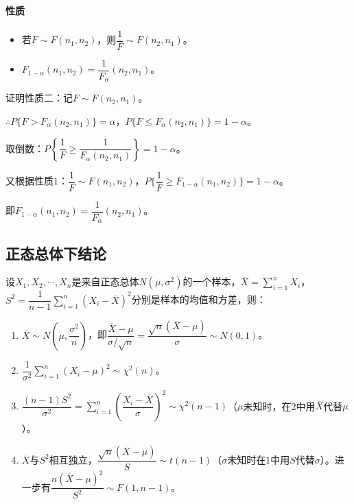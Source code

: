 \documentclass[UTF8, 12pt]{ctexart}
\begin{document}

\paragraph{性质} \leavevmode \medskip

\begin{itemize}
    \item 若$F\sim F(n_1,n_2)$，则$\dfrac{1}{F}\sim F(n_2,n_1)$。
    \item $F_{1-\alpha}(n_1,n_2)=\dfrac{1}{F_\alpha}(n_2,n_1)$。
\end{itemize}

证明性质二：记$F\sim F(n_2,n_1)$。

$\therefore P\{F>F_\alpha(n_2,n_1)\}=\alpha$，$P\{F\leqslant F_\alpha(n_2,n_1)\}=1-\alpha$。

取倒数：$P\left\{\dfrac{1}{F}\geqslant\dfrac{1}{F_\alpha(n_2,n_1)}\right\}=1-\alpha$。

又根据性质1：$\dfrac{1}{F}\sim F(n_1,n_2)$，$P\{\dfrac{1}{F}\geqslant F_{1-\alpha}(n_1,n_2)\}=1-\alpha$。

即$F_{1-\alpha}(n_1,n_2)=\dfrac{1}{F_\alpha}(n_2,n_1)$。

\subsection{正态总体下结论}

设$X_1,X_2,\cdots,X_n$是来自正态总体$N(\mu,\sigma^2)$的一个样本，$\overline{X}=\sum\limits_{i=1}^nX_i$，$S^2=\dfrac{1}{n-1}\sum\limits_{i=1}^n(X_i-\overline{X})^2$分别是样本的均值和方差，则：

\begin{enumerate}
    \item $\overline{X}\sim N\left(\mu,\dfrac{\sigma^2}{n}\right)$，即$\dfrac{\overline{X}-\mu}{\sigma/\sqrt{n}}=\dfrac{\sqrt{n}(\overline{X}-\mu)}{\sigma}\sim N(0,1)$。
    \item $\dfrac{1}{\sigma^2}\sum\limits_{i=1}^n(X_i-\mu)^2\sim\chi^2(n)$。
    \item $\dfrac{(n-1)S^2}{\sigma^2}=\sum\limits_{i=1}^n\left(\dfrac{X_i-\overline{X}}{\sigma}\right)^2\sim\chi^2(n-1)$（$\mu$未知时，在2中用$\overline{X}$代替$\mu$）。
    \item $\overline{X}$与$S^2$相互独立，$\dfrac{\sqrt{n}(\overline{X}-\mu)}{S}\sim t(n-1)$（$\sigma$未知时在1中用$S$代替$\sigma$）。进一步有$\dfrac{n(\overline{X}-\mu)^2}{S^2}\sim F(1,n-1)$。
\end{enumerate}
\end{document}
